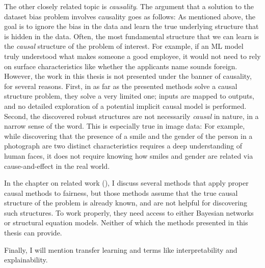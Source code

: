 The other closely related topic is \emph{causality}.
The argument that a solution to the dataset bias problem involves causality goes as follows:
As mentioned above, the goal is to ignore the bias in the data
and learn the true underlying structure that is hidden in the data.
Often, the most fundamental structure that we can learn is the \emph{causal} structure of the problem of interest.
For example, if an \acs{ML} model truly understood what makes someone a good employee,
it would not need to rely on surface characteristics like whether the applicants name sounds foreign.
However, the work in this thesis is not presented under the banner of causality, for several reasons.
First, in as far as the presented methods solve a causal structure problem, they solve a very limited one;
inputs are mapped to outputs, and no detailed exploration of a potential implicit causal model is performed.
Second, the discovered robust structures are not necessarily \emph{causal} in nature, in a narrow sense of the word.
This is especially true in image data:
For example, while discovering that the presence of a smile and the gender of the person in a photograph are two distinct characteristics
requires a deep understanding of human faces,
it does not require knowing how smiles and gender are related via cause-and-effect in the real world.

In the chapter on related work (),
I discuss several methods that apply proper causal methods to fairness,
but those methods assume that the true causal structure of the problem is already known,
and are not helpful for discovering such structures.
To work properly, they need access to either Bayesian networks or structural equation models.
Neither of which the methods presented in this thesis can provide.

Finally, I will mention transfer learning and terms like interpretability and explainability.

